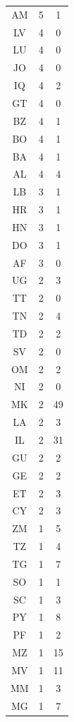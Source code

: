 {\begin{table}[ht]
{{\begin{tabular}{c|cc}
            AM & 5 & 1\\
            LV & 4 & 0\\
            LU & 4 & 0\\
            JO & 4 & 0\\
            IQ & 4 & 2\\
            GT & 4 & 0\\
            BZ & 4 & 1\\
            BO & 4 & 1\\
            BA & 4 & 1\\
            AL & 4 & 4\\
            LB & 3 & 1\\
            HR & 3 & 1\\
            HN & 3 & 1\\
            DO & 3 & 1\\
            AF & 3 & 0\\
            UG & 2 & 3\\
            TT & 2 & 0\\
            TN & 2 & 4\\
            TD & 2 & 2\\
            SV & 2 & 0\\
            OM & 2 & 2\\
            NI & 2 & 0\\
            MK & 2 & 49\\
            LA & 2 & 3\\
            IL & 2 & 31\\
            GU & 2 & 2\\
            GE & 2 & 2\\
            ET & 2 & 3\\
            CY & 2 & 3\\
            ZM & 1 & 5\\
            TZ & 1 & 4\\
            TG & 1 & 7\\
            SO & 1 & 1\\
            SC & 1 & 3\\
            PY & 1 & 8\\
            PF & 1 & 2\\
            MZ & 1 & 15\\
            MV & 1 & 11\\
            MM & 1 & 3\\
            MG & 1 & 7\\

\end{tabular}}}
\end{table}}

